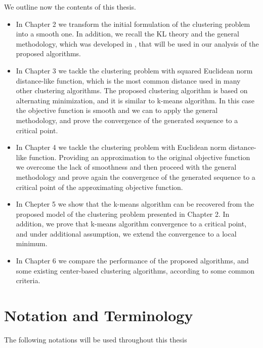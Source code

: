 We outline now the contents of this thesis.
\begin{itemize}
	\item In Chapter 2 we transform the initial formulation  of the clustering problem into a smooth one. In addition, we recall the KL theory and the general methodology, which was developed in \cite{BST2014}, that will be used in our analysis of the proposed algorithms.
	\item In Chapter 3 we tackle the clustering problem with squared Euclidean norm distance-like function, which is the most common distance used in many other clustering algorithms. The proposed clustering algorithm is based on alternating minimization, and it is similar to k-means algorithm. In this case the objective function is smooth and we can to apply the general methodology, and prove the convergence of the generated sequence to a critical point.
	\item In Chapter 4 we tackle the clustering problem with Euclidean norm distance-like function. Providing an approximation to the original objective function we overcome the lack of smoothness and then proceed with the general methodology and prove again the convergence of the generated sequence to a critical point of the approximating objective function.
	\item In Chepter 5 we show that the k-means algorithm can be recovered from the proposed model of the clustering problem presented in Chapter 2. In addition, we prove that k-means algorithm convergence to a critical point, and under additional assumption, we extend the convergence to a local minimum.
	\item In Chapter 6 we compare the performance of the proposed algorithms, and some existing center-based clustering algorithms, according to some common criteria.
\end{itemize}

\section{Notation and Terminology}

The following notations will be used throughout this thesis

